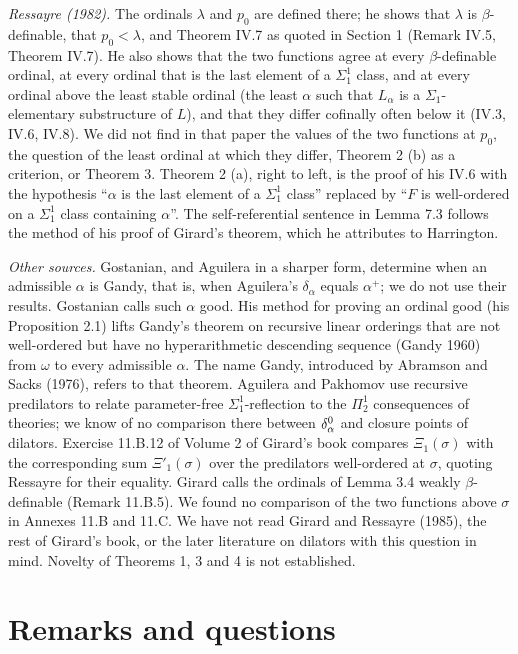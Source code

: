 \documentclass[11pt]{article}
\begin{document}
\emph{Ressayre (1982).} The ordinals $\lambda$ and $p_0$ are defined there; he shows that $\lambda$ is $\beta$-definable,
that $p_0 < \lambda$, and Theorem IV.7 as quoted in Section 1 (Remark IV.5, Theorem IV.7). He also shows that the two
functions agree at every $\beta$-definable ordinal, at every ordinal that is the last element of a $\Sigma^1_1$
class, and at every ordinal above the least stable ordinal (the least $\alpha$ such that $L_{\alpha}$ is a
$\Sigma_1$-elementary substructure of $L$), and that they differ cofinally often below it (IV.3, IV.6, IV.8). We
did not find in that paper the values of the two functions at $p_0$, the question of the least ordinal at which
they differ, Theorem 2 (b) as a criterion, or Theorem 3. Theorem 2 (a), right to left, is the proof of his IV.6
with the hypothesis ``$\alpha$ is the last element of a $\Sigma^1_1$ class'' replaced by ``$F$ is well-ordered on a
$\Sigma^1_1$ class containing $\alpha$''. The self-referential sentence in Lemma 7.3 follows the method of his
proof of Girard's theorem, which he attributes to Harrington.

\emph{Other sources.} Gostanian, and Aguilera in a sharper form, determine when an admissible
$\alpha$ is Gandy, that is, when Aguilera's $\delta_{\alpha}$ equals $\alpha^+$; we do not use their results.
Gostanian calls such $\alpha$ good. His method for proving an ordinal good (his Proposition 2.1) lifts Gandy's
theorem on recursive linear orderings that are not well-ordered but have no hyperarithmetic descending sequence
(Gandy 1960) from $\omega$ to every admissible $\alpha$. The name Gandy, introduced by Abramson and Sacks (1976),
refers to that theorem. Aguilera and Pakhomov use recursive predilators to relate parameter-free
$\Sigma^1_1$-reflection to the $\Pi^1_2$ consequences of theories; we know of no comparison there between
$\delta^0_{\alpha}$ and closure points of dilators. Exercise 11.B.12 of Volume 2 of Girard's book compares
$\Xi_1(\sigma)$ with the corresponding sum $\Xi'_1(\sigma)$ over the predilators well-ordered at $\sigma$, quoting
Ressayre for their equality. Girard calls the ordinals
of Lemma 3.4 weakly $\beta$-definable (Remark 11.B.5). We found no comparison of the two functions above $\sigma$
in Annexes 11.B and 11.C. We have not read Girard and Ressayre (1985), the rest of Girard's book, or the later
literature on dilators with this question in mind.
Novelty of Theorems 1, 3 and 4 is not established.

\section{Remarks and questions}
\end{document}
